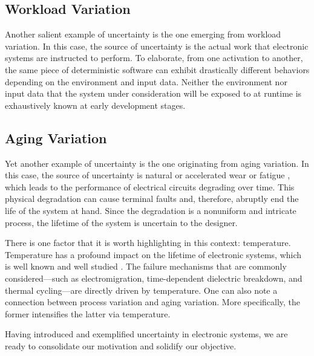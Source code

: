 \subsection{Workload Variation}

Another salient example of uncertainty is the one emerging from workload
variation. In this case, the source of uncertainty is the actual work that
electronic systems are instructed to perform. To elaborate, from one activation
to another, the same piece of deterministic software can exhibit drastically
different behaviors depending on the environment and input data. Neither the
environment nor input data that the system under consideration will be exposed
to at runtime is exhaustively known at early development stages.

\subsection{Aging Variation}

Yet another example of uncertainty is the one originating from aging variation.
In this case, the source of uncertainty is natural or accelerated wear or
fatigue \cite{jedec2016}, which leads to the performance of electrical circuits
degrading over time. This physical degradation can cause terminal faults and,
therefore, abruptly end the life of the system at hand. Since the degradation is
a nonuniform and intricate process, the lifetime of the system is uncertain to
the designer.

There is one factor that it is worth highlighting in this context: temperature.
Temperature has a profound impact on the lifetime of electronic systems, which
is well known and well studied \cite{jedec2016}. The failure mechanisms that are
commonly considered---such as electromigration, time-dependent dielectric
breakdown, and thermal cycling---are directly driven by temperature. One can
also note a connection between process variation and aging variation. More
specifically, the former intensifies the latter via temperature.

\conclusioncut
Having introduced and exemplified uncertainty in electronic systems, we are
ready to consolidate our motivation and solidify our objective.
